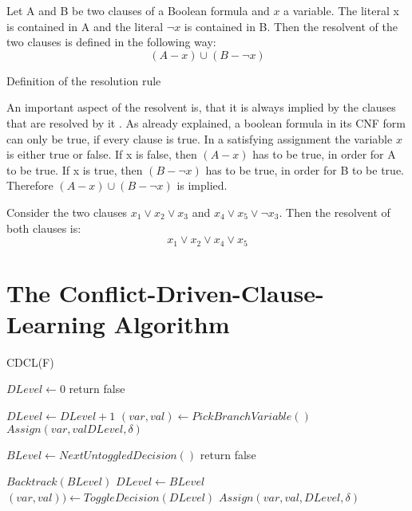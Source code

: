 \begin{definition}
\begin{leftbar}
Let A and B be two clauses of a Boolean formula and $x$ a variable. The literal x is contained in A and the literal $\neg x$ is contained in B. Then the resolvent of the two clauses is defined in the following way:
\begin{displaymath}
(A - x) \cup (B - \neg x)
\end{displaymath}
\end{leftbar}
\caption{Definition of the resolution rule \cite{robinson1965machine}}
\label{def:Resolution}
\end{definition}
An important aspect of the resolvent is, that it is always implied by the clauses that are resolved by it \cite{biere2009handbook}. As already explained, a boolean formula in its CNF form can only be true, if every clause is true. In a satisfying assignment the variable $x$ is either true or false. If x is false, then $(A - x)$ has to be true, in order for A to be true. If x is true, then $(B - \neg x)$ has to be true, in order for B to be true. Therefore $(A - x) \cup (B - \neg x)$ is implied.

\begin{leftbar}
Consider the two clauses $x_1 \vee x_2 \vee x_3$ and $x_4 \vee x_5 \vee \neg x_3$. Then the resolvent of both clauses is:
\begin{displaymath}
x_1 \vee x_2 \vee x_4 \vee x_5
\end{displaymath}
\end{leftbar}

\section{The Conflict-Driven-Clause-Learning Algorithm}
\label{sec:cdcl}

\begin{algorithm}
\caption{CDCL(F) \cite{biere2009handbook}}\label{alg:CDCL}
\begin{algorithmic}
\State $DLevel \gets 0$
	\State return false
\EndIf

	\State $DLevel \gets DLevel + 1$
	\State $(var, val) \gets PickBranchVariable()$
	\State $Assign(var, val DLevel, \delta)$
	
		\State $BLevel \gets NextUntoggledDecision()$
			\State return false
		\EndIf
		
		\State $Backtrack(BLevel)$
		\State $DLevel \gets BLevel$
		\State $(var,val)) \gets ToggleDecision(DLevel)$
		\State $Assign(var, val, DLevel, \delta)$
	\EndWhile
\EndWhile
\end{algorithmic}
\end{algorithm}


